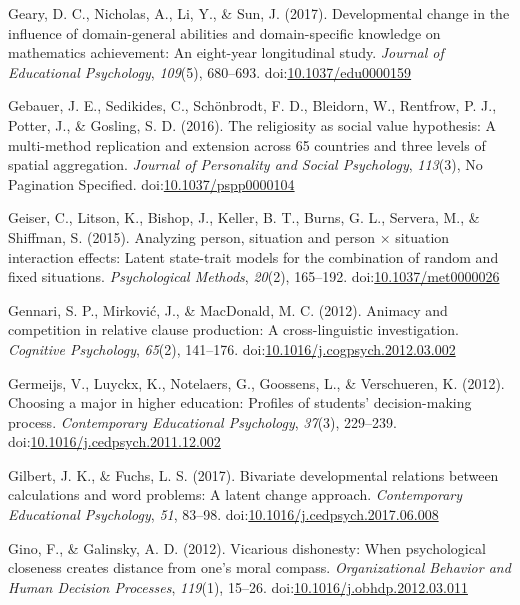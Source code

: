 \documentclass[english,man]{apa6}
\begin{document}
\hypertarget{ref-Geary2017}{}
Geary, D. C., Nicholas, A., Li, Y., \& Sun, J. (2017). Developmental
change in the influence of domain-general abilities and domain-specific
knowledge on mathematics achievement: An eight-year longitudinal study.
\emph{Journal of Educational Psychology}, \emph{109}(5), 680--693.
doi:\href{https://doi.org/10.1037/edu0000159}{10.1037/edu0000159}

\hypertarget{ref-Gebauer2016}{}
Gebauer, J. E., Sedikides, C., Schönbrodt, F. D., Bleidorn, W.,
Rentfrow, P. J., Potter, J., \& Gosling, S. D. (2016). The religiosity
as social value hypothesis: A multi-method replication and extension
across 65 countries and three levels of spatial aggregation.
\emph{Journal of Personality and Social Psychology}, \emph{113}(3), No
Pagination Specified.
doi:\href{https://doi.org/10.1037/pspp0000104}{10.1037/pspp0000104}

\hypertarget{ref-Geiser2015}{}
Geiser, C., Litson, K., Bishop, J., Keller, B. T., Burns, G. L.,
Servera, M., \& Shiffman, S. (2015). Analyzing person, situation and
person × situation interaction effects: Latent state-trait models for
the combination of random and fixed situations. \emph{Psychological
Methods}, \emph{20}(2), 165--192.
doi:\href{https://doi.org/10.1037/met0000026}{10.1037/met0000026}

\hypertarget{ref-Gennari2012}{}
Gennari, S. P., Mirković, J., \& MacDonald, M. C. (2012). Animacy and
competition in relative clause production: A cross-linguistic
investigation. \emph{Cognitive Psychology}, \emph{65}(2), 141--176.
doi:\href{https://doi.org/10.1016/j.cogpsych.2012.03.002}{10.1016/j.cogpsych.2012.03.002}

\hypertarget{ref-Germeijs2012}{}
Germeijs, V., Luyckx, K., Notelaers, G., Goossens, L., \& Verschueren,
K. (2012). Choosing a major in higher education: Profiles of students'
decision-making process. \emph{Contemporary Educational Psychology},
\emph{37}(3), 229--239.
doi:\href{https://doi.org/10.1016/j.cedpsych.2011.12.002}{10.1016/j.cedpsych.2011.12.002}

\hypertarget{ref-Gilbert2017}{}
Gilbert, J. K., \& Fuchs, L. S. (2017). Bivariate developmental
relations between calculations and word problems: A latent change
approach. \emph{Contemporary Educational Psychology}, \emph{51}, 83--98.
doi:\href{https://doi.org/10.1016/j.cedpsych.2017.06.008}{10.1016/j.cedpsych.2017.06.008}

\hypertarget{ref-Gino2012}{}
Gino, F., \& Galinsky, A. D. (2012). Vicarious dishonesty: When
psychological closeness creates distance from one's moral compass.
\emph{Organizational Behavior and Human Decision Processes},
\emph{119}(1), 15--26.
doi:\href{https://doi.org/10.1016/j.obhdp.2012.03.011}{10.1016/j.obhdp.2012.03.011}
\end{document}
